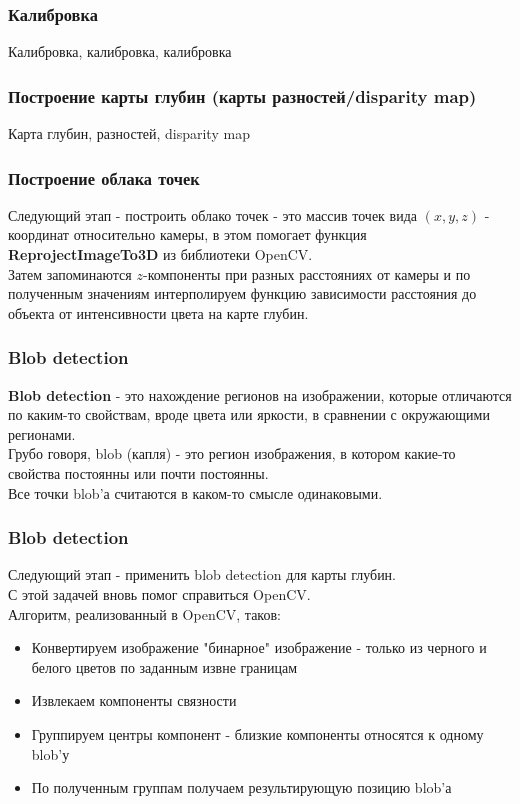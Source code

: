 \documentclass{beamer}
\begin{document}
		\begin{frame}
			\frametitle{Калибровка}

			Калибровка, калибровка, калибровка			
			
		\end{frame}
		
		\begin{frame}
			\frametitle{Построение карты глубин (карты разностей/disparity map)}
			
			Карта глубин, разностей, disparity map			
			
		\end{frame}
		
		\begin{frame}
			\frametitle{Построение облака точек}
			
			Следующий этап - построить облако точек - это массив
			точек вида $(x, y, z)$ - координат относительно камеры, в
			этом помогает функция \textbf{ReprojectImageTo3D} из библиотеки
			OpenCV.\\
			Затем запоминаются $z$-компоненты при разных расстояниях от камеры
			и по полученным значениям интерполируем функцию зависимости
			расстояния до объекта от интенсивности цвета на карте глубин.
			
		\end{frame}
		
		\begin{frame}
			\frametitle{Blob detection}
			
			\textbf{Blob detection} - это нахождение регионов на изображении,
			которые отличаются по каким-то свойствам, вроде цвета
			или яркости, в сравнении с окружающими регионами.\\
			Грубо говоря, blob (капля) - это регион изображения,
			в котором какие-то свойства постоянны или почти
			постоянны.\\
			Все точки blob'а считаются в каком-то смысле
			одинаковыми.\\
			
		\end{frame}
		
		\begin{frame}
			\frametitle{Blob detection}
			
			Следующий этап - применить blob detection для карты глубин.\\
			С этой задачей вновь помог справиться OpenCV.\\
			Алгоритм, реализованный в OpenCV, таков:\\
			\begin{itemize}
				\item Конвертируем изображение "бинарное" изображение - только
					  из черного и белого цветов по заданным извне границам
				\item Извлекаем компоненты связности
				\item Группируем центры компонент - близкие компоненты относятся к одному blob'у
				\item По полученным группам получаем результирующую позицию blob'а
			\end{itemize}
			
		\end{frame}
\end{document}
